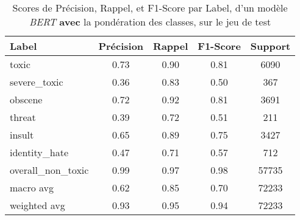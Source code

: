 \begin{table}[ht]
    \centering
    \caption{Scores de Précision, Rappel, et F1-Score par Label, d'un modèle \textit{BERT} \textbf{avec} la pondération des classes, sur le jeu de test}    \begin{tabular}{lcccc}
    \hline
    \textbf{Label} & \textbf{Précision} & \textbf{Rappel} & \textbf{F1-Score} & \textbf{Support} \\ \hline
    toxic          & 0.73               & 0.90            & 0.81              & 6090             \\
    severe\_toxic  & 0.36               & 0.83            & 0.50              & 367              \\
    obscene        & 0.72               & 0.92            & 0.81              & 3691             \\
    threat         & 0.39               & 0.72            & 0.51              & 211              \\
    insult         & 0.65               & 0.89            & 0.75              & 3427             \\
    identity\_hate & 0.47               & 0.71            & 0.57              & 712              \\
    overall\_non\_toxic & 0.99           & 0.97            & 0.98              & 57735            \\\hline
    macro avg      & 0.62              & 0.85            & 0.70              & 72233            \\
    weighted avg   & 0.93               & 0.95            & 0.94             & 72233            \\ \hline
    \end{tabular}
    \label{tab:scores}
\end{table}